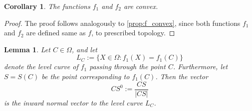 \documentclass[openany]{book}
\newtheorem{corollary}{Corollary}
\newtheorem{lemma}{Lemma}
\begin{document}
	\begin{corollary}\label{cor:f1f2_convex}
		The functions \(f_1\) and \(f_2\) are convex.
	\end{corollary}
	\begin{proof}
		The proof follows analogously to \cref{prop:f_convex}, since both functions
		\(f_1\) and \(f_2\) are defined same as \(f\), to prescribed topology.
	\end{proof}


	\begin{lemma}\label{lem:f1_level_normal}
		Let \(C \in \Omega\), and let
		\[
		L_C := \{X \in \Omega : f_1(X)=f_1(C)\}
		\]
		denote the level curve of \(f_1\) passing through the point \(C\).
		Furthermore, let \(S = S(C)\) be the point corresponding
		to \(f_1(C)\).
		Then the vector
		\[
		CS^0 := \frac{CS}{|CS|}
		\]
		is the inward normal vector to the level curve \(L_C\).
	\end{lemma}
\end{document}
